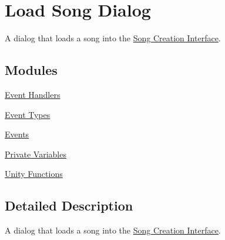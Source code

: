 \hypertarget{group___doc_s_c___l_s_d}{}\section{Load Song Dialog}
\label{group___doc_s_c___l_s_d}


A dialog that loads a song into the \hyperlink{group___doc_s_c}{Song Creation Interface}.  


\subsection*{Modules}
\begin{DoxyCompactItemize}
\item 
\hyperlink{group___s_c___l_s_d_handlers}{Event Handlers}
\item 
\hyperlink{group___s_c___l_s_d_event_types}{Event Types}
\item 
\hyperlink{group___s_c___l_s_d_events}{Events}
\item 
\hyperlink{group___s_c___l_s_d_priv_var}{Private Variables}
\item 
\hyperlink{group___s_c___l_s_d_unity}{Unity Functions}
\end{DoxyCompactItemize}


\subsection{Detailed Description}
A dialog that loads a song into the \hyperlink{group___doc_s_c}{Song Creation Interface}. 

